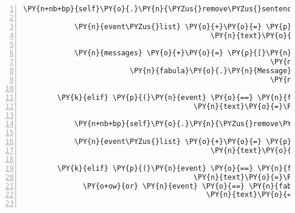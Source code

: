 \begin{Verbatim}[commandchars=\\\{\},numbers=left,firstnumber=1,stepnumber=1]
            \PY{n+nb+bp}{self}\PY{o}{.}\PY{n}{\PYZus{}remove\PYZus{}sentence}\PY{p}{(}\PY{n}{ID\PYZus{}KUNI}\PY{p}{,} \PY{n}{event}\PY{o}{.}\PY{n}{text}\PY{p}{)}

            \PY{n}{event\PYZus{}list} \PY{o}{+}\PY{o}{=} \PY{p}{[}\PY{n}{fabula}\PY{o}{.}\PY{n}{SaysEvent}\PY{p}{(}\PY{n}{identifier}\PY{o}{=}\PY{n}{ID\PYZus{}CASSANDRA}\PY{p}{,}
                                            \PY{n}{text}\PY{o}{=}\PY{l+s}{\PYZsq{}}\PY{l+s}{Mein Flügel muss geklebt werden dann könnte ich über den Fluss fliegen.}\PY{l+s}{\PYZsq{}}\PY{p}{)}\PY{p}{]}

            \PY{n}{messages} \PY{o}{+}\PY{o}{=} \PY{p}{[}\PY{n}{fabula}\PY{o}{.}\PY{n}{Message}\PY{p}{(}\PY{p}{[}\PY{n}{fabula}\PY{o}{.}\PY{n}{SaysEvent}\PY{p}{(}\PY{n}{identifier}\PY{o}{=}\PY{n}{ID\PYZus{}CASSANDRA}\PY{p}{,}
                                                          \PY{n}{text}\PY{o}{=}\PY{l+s}{\PYZsq{}}\PY{l+s}{Ich pass da nicht durch}\PY{l+s}{\PYZsq{}}\PY{p}{)}\PY{p}{]}\PY{p}{)}\PY{p}{,}
                         \PY{n}{fabula}\PY{o}{.}\PY{n}{Message}\PY{p}{(}\PY{p}{[}\PY{n}{fabula}\PY{o}{.}\PY{n}{SaysEvent}\PY{p}{(}\PY{n}{identifier}\PY{o}{=}\PY{n}{ID\PYZus{}KUNI}\PY{p}{,}
                                                          \PY{n}{text}\PY{o}{=}\PY{l+s}{\PYZsq{}}\PY{l+s}{Dann flieg doch beim Schild über den Fluss.}\PY{l+s}{\PYZsq{}}\PY{p}{)}\PY{p}{]}\PY{p}{)}\PY{p}{]}

        \PY{k}{elif} \PY{p}{(}\PY{n}{event} \PY{o}{==} \PY{n}{fabula}\PY{o}{.}\PY{n}{SaysEvent}\PY{p}{(}\PY{n}{identifier}\PY{o}{=}\PY{n}{ID\PYZus{}KUNI}\PY{p}{,}
                                        \PY{n}{text}\PY{o}{=}\PY{l+s}{\PYZsq{}}\PY{l+s}{Deine Flügel sind ganz, du kannst wieder fliegen!}\PY{l+s}{\PYZsq{}}\PY{p}{)}\PY{p}{)}\PY{p}{:}

            \PY{n+nb+bp}{self}\PY{o}{.}\PY{n}{\PYZus{}remove\PYZus{}sentence}\PY{p}{(}\PY{n}{ID\PYZus{}KUNI}\PY{p}{,} \PY{n}{event}\PY{o}{.}\PY{n}{text}\PY{p}{)}

            \PY{n}{event\PYZus{}list} \PY{o}{+}\PY{o}{=} \PY{p}{[}\PY{n}{fabula}\PY{o}{.}\PY{n}{SaysEvent}\PY{p}{(}\PY{n}{identifier}\PY{o}{=}\PY{n}{ID\PYZus{}CASSANDRA}\PY{p}{,}
                                            \PY{n}{text}\PY{o}{=}\PY{l+s}{\PYZsq{}}\PY{l+s}{Tausend Dank!}\PY{l+s}{\PYZsq{}}\PY{p}{)}\PY{p}{]}

        \PY{k}{elif} \PY{p}{(}\PY{n}{event} \PY{o}{==} \PY{n}{fabula}\PY{o}{.}\PY{n}{SaysEvent}\PY{p}{(}\PY{n}{identifier}\PY{o}{=}\PY{n}{ID\PYZus{}KUNI}\PY{p}{,}
                                        \PY{n}{text}\PY{o}{=}\PY{l+s}{\PYZsq{}}\PY{l+s}{Hinter der Spinne ist doch irgendwas!}\PY{l+s}{\PYZsq{}}\PY{p}{)}
              \PY{o+ow}{or} \PY{n}{event} \PY{o}{==} \PY{n}{fabula}\PY{o}{.}\PY{n}{SaysEvent}\PY{p}{(}\PY{n}{identifier}\PY{o}{=}\PY{n}{ID\PYZus{}CASSANDRA}\PY{p}{,}
                                           \PY{n}{text}\PY{o}{=}\PY{l+s}{\PYZsq{}}\PY{l+s}{Die Spinne verbirgt etwas!}\PY{l+s}{\PYZsq{}}\PY{p}{)}\PY{p}{)}\PY{p}{:}


\end{Verbatim}
